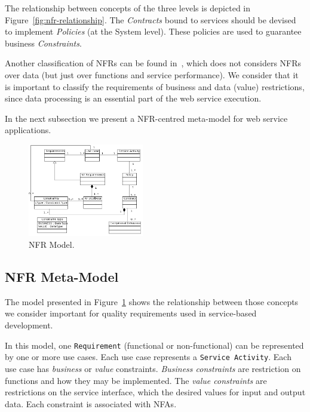 \documentclass{sig-alternate}
\begin{document}
The relationship between concepts of the three levels is depicted in Figure~\ref{fig:nfr-relationship}.
The \textit{Contracts} bound to services should be devised to implement \textit{Policies} (at the System level).
These policies are used to guarantee business \textit{Constraints}.



Another classification of NFRs can be found in~\cite{Yeom2006}, which does not considers NFRs over data (but just over functions and service performance). 
We consider that it is important to classify the requirements of business and data (value) restrictions, since data processing is an essential part of the web service execution.

In the next subsection we present a NFR-centred meta-model for web service applications.

\begin{figure}[ht!]  
\centering  
\includegraphics[width=0.45\textwidth]{figs/metamodelo.png}
\caption{NFR Model.}
\label{fig:NRFmodel} 
\end{figure} 


\subsection{NFR Meta-Model} 
\label{sec:nfr-metamodel}

The model presented in Figure~\ref{fig:NRFmodel} shows the relationship between
those concepts
we consider important for quality requirements used
in service-based development.

In this model, one \texttt{Requirement} (functional or non-func\-tion\-al) can be represented by one or more use cases. 
Each use case represents a \texttt{Service Activity}. 
Each use case has \textit{business} or
\textit{value} constraints. 
\textit{Business constraints} are restriction on functions and how they may be implemented. The \textit{value constraints} are restrictions on
the service interface, which the desired values for input and output data. Each
constraint is associated with NFAs.
\end{document}
